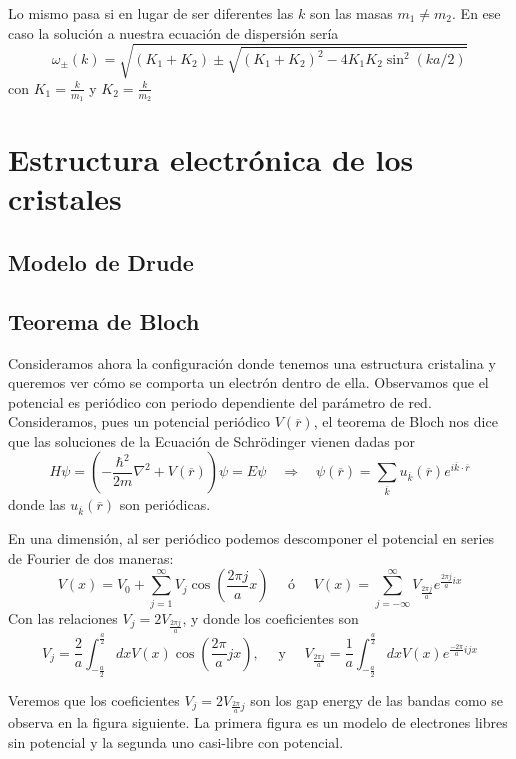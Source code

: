 \documentclass[leqno]{article}
\begin{document}
Lo mismo pasa si en lugar de ser diferentes las $k$ son las masas  $m_1\neq m_2$. En ese caso la solución a nuestra ecuación de dispersión sería
\[
  \boxed{\omega _{\pm}(k) = \sqrt{ (K_1+K_2)\pm \sqrt{(K_1+K_2)^2-4K_1K_2\sin^2(ka / 2)} } }
\] 
con $K_1= \frac{k}{m_1}$ y $K_2 = \frac{k}{m_2}$



\section{Estructura electrónica de los cristales}
\subsection{Modelo de Drude}

\subsection{Teorema de Bloch}
Consideramos ahora la configuración donde tenemos una estructura cristalina y queremos ver cómo se comporta un electrón dentro de ella. Observamos que el potencial es periódico con periodo dependiente del parámetro de red. Consideramos, pues un potencial periódico $V(\overline{r})$, el teorema de Bloch nos dice que las soluciones de la Ecuación de Schrödinger vienen dadas por 
\[
H\psi = \left( -\frac{\hbar ^2}{2m}\nabla ^2 + V(\overline{r}) \right) \psi = E\psi \quad \Rightarrow \quad \psi (\overline{r}) = \sum _{\overline{k}} u_{\overline{k}}(\overline{r}) e ^{i \overline{k}\cdot \overline{r}}
\] 
donde las $u_{\overline{k}}(\overline{r})$ son periódicas.

En una dimensión, al ser periódico podemos descomponer el potencial en series de Fourier de dos maneras:
\[
V(x)=V_0 + \sum _{j=1}^\infty V_j\cos\left( \frac{2\pi j}{a}x \right)  \quad \text{ ó } \quad 
V(x)=\sum_{j=-\infty}^\infty V_{\frac{2\pi j}{a}} e ^{\frac{2\pi j}{a}ix}
\]
Con las relaciones $V_j = 2 V_{\frac{2\pi j}{a}}$, y donde los coeficientes son
\[
  V_j = \frac{2}{a} \int _{-\frac{a}{2}} ^{\frac{a}{2}} dx V(x)\cos\left( \frac{2\pi }{a}jx \right) , \quad \text{ y } \quad 
  V_{\frac{2\pi j}{a}} = \frac{1}{a} \int _{-\frac{a}{2}} ^{\frac{a}{2}} dx V(x)e ^{\frac{-2\pi }{a}ijx}
\] 

Veremos que los coeficientes $V_{j} = 2V_{\frac{2\pi }{a}j}$ son los gap energy de las bandas como se observa en la figura siguiente. La primera figura es un modelo de electrones libres sin potencial y la segunda uno casi-libre con potencial.
\end{document}
